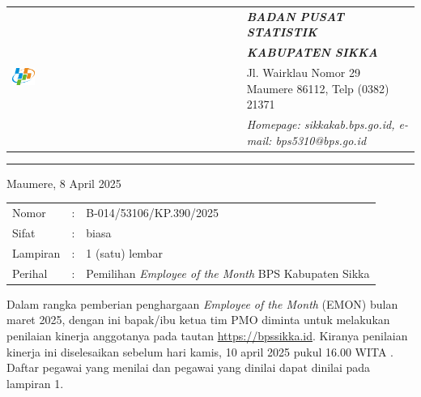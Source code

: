 \documentclass{article}
\begin{document}




\begin{tabular}{ll}
   \multirow{4}{*}{\includegraphics[width=0.10\textwidth]{logo/bps-logo.png}} %
   &
   \large{\textbf{\textit{BADAN PUSAT STATISTIK}}} \\
   & \large{\textbf{\textit{KABUPATEN SIKKA}}} \\
   & Jl. Wairklau Nomor 29 Maumere 86112, Telp (0382) 21371 \\
   & \textit{Homepage: sikkakab.bps.go.id, e-mail: bps5310@bps.go.id} \\
\end{tabular}

\hfill

\vspace{-1em} %

\rule{\linewidth}{1pt} %


\hfill
Maumere, 8 April 2025

\begin{tabular}{@{} lcl}
	Nomor&:&B-014/53106/KP.390/2025 \\
	Sifat&:&biasa \\
	Lampiran&:&1 (satu) lembar\\
    Perihal&:& Pemilihan \textit{Employee of the Month} BPS Kabupaten Sikka\\
\end{tabular}

\bigskip %

Dalam rangka pemberian penghargaan \textit{Employee of the Month} (EMON) bulan maret 2025, dengan ini bapak/ibu ketua tim PMO diminta untuk melakukan penilaian kinerja anggotanya pada tautan \href{https://bpssikka.id/}{https://bpssikka.id}.
Kiranya penilaian kinerja ini diselesaikan sebelum hari kamis, 10 april 2025 pukul 16.00 WITA \@.
Daftar pegawai yang menilai dan pegawai yang dinilai dapat dinilai pada lampiran 1.
\end{document}

